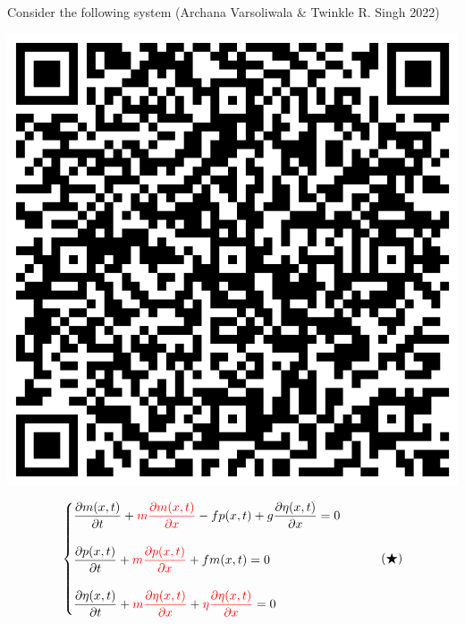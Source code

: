 \documentclass[]{article}
\begin{document}
\begin{example}
    Consider the following system (Archana Varsoliwala \& Twinkle R. Singh 2022)
    \par
    \begin{minipage}{0.25\textwidth}
        \hspace*{1cm}\includegraphics[scale=.08]{archana_link.png}
    \end{minipage}
    \begin{minipage}{0.75\textwidth}
        \begin{equation}
            \begin{cases}
                \displaystyle \pdv{m(x,t)}{t} + \textcolor{red}{m \pdv{m(x,t)}{x}} - fp(x,t) + g\pdv{\eta(x,t)}{x} = 0
                \\\\
                \displaystyle \pdv{p(x,t)}{t} + \textcolor{red}{m \pdv{p(x,t)}{x}} + fm(x,t) = 0
                \\\\
                \displaystyle \pdv{\eta(x,t)}{t} + \textcolor{red}{m \pdv{\eta(x,t)}{x}} + \textcolor{red}{\eta\pdv{\eta(x,t)}{x}} = 0
            \end{cases}
            \tag{$\bigstar$}
        \end{equation}
    \end{minipage}

\end{example}
\end{document}
